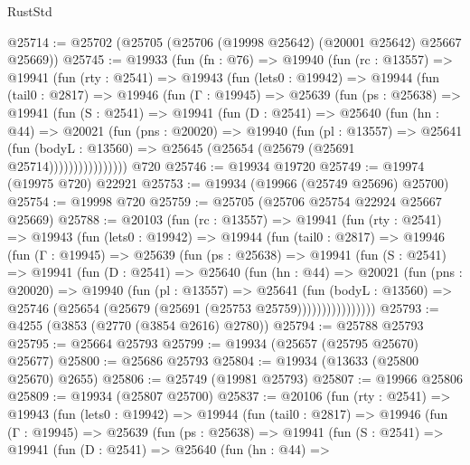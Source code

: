 \begin{lexlean}{RustStd}
\begin{coremodule}
@25714 := @25702 (@25705 (@25706 (@19998 @25642) (@20001 @25642) @25667 @25669))
@25745 := @19933
    (fun (fn : @76) =>
    @19940
      (fun (rc : @13557) =>
      @19941
        (fun (rty : @2541) =>
        @19943
          (fun (lets0 : @19942) =>
          @19944
            (fun (tail0 : @2817) =>
            @19946
              (fun (Γ : @19945) =>
              @25639
                (fun (ps : @25638) =>
                @19941
                  (fun (S : @2541) =>
                  @19941
                    (fun (D : @2541) =>
                    @25640
                      (fun (hn : @44) =>
                      @20021
                        (fun (pns : @20020) =>
                        @19940
                          (fun (pl : @13557) =>
                          @25641
                            (fun (bodyL : @13560) =>
                            @25645 (@25654 (@25679 (@25691 @25714))))))))))))))))
    @720
@25746 := @19934 @19720
@25749 := @19974 (@19975 @720) @22921
@25753 := @19934 (@19966 (@25749 @25696) @25700)
@25754 := @19998 @720
@25759 := @25705 (@25706 @25754 @22924 @25667 @25669)
@25788 := @20103
    (fun (rc : @13557) =>
    @19941
      (fun (rty : @2541) =>
      @19943
        (fun (lets0 : @19942) =>
        @19944
          (fun (tail0 : @2817) =>
          @19946
            (fun (Γ : @19945) =>
            @25639
              (fun (ps : @25638) =>
              @19941
                (fun (S : @2541) =>
                @19941
                  (fun (D : @2541) =>
                  @25640
                    (fun (hn : @44) =>
                    @20021
                      (fun (pns : @20020) =>
                      @19940
                        (fun (pl : @13557) =>
                        @25641
                          (fun (bodyL : @13560) =>
                          @25746 (@25654 (@25679 (@25691 (@25753 @25759))))))))))))))))
@25793 := @4255 (@3853 (@2770 (@3854 @2616) @2780))
@25794 := @25788 @25793
@25795 := @25664 @25793
@25799 := @19934 (@25657 (@25795 @25670) @25677)
@25800 := @25686 @25793
@25804 := @19934 (@13633 (@25800 @25670) @2655)
@25806 := @25749 (@19981 @25793)
@25807 := @19966 @25806
@25809 := @19934 (@25807 @25700)
@25837 := @20106
    (fun (rty : @2541) =>
    @19943
      (fun (lets0 : @19942) =>
      @19944
        (fun (tail0 : @2817) =>
        @19946
          (fun (Γ : @19945) =>
          @25639
            (fun (ps : @25638) =>
            @19941
              (fun (S : @2541) =>
              @19941
                (fun (D : @2541) =>
                @25640
                  (fun (hn : @44) =>

\end{coremodule}
\end{lexlean}
